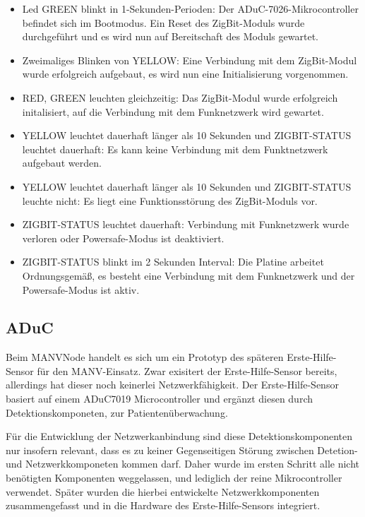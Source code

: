 \begin{itemize}
    \item{Led GREEN blinkt in 1-Sekunden-Perioden:} Der ADuC-7026-Mikrocontroller befindet sich im Bootmodus. Ein Reset des
                                                    ZigBit-Moduls wurde durchgeführt und es wird nun auf Bereitschaft des Moduls
                                                    gewartet.
    \item{Zweimaliges Blinken von YELLOW:} Eine Verbindung mit dem ZigBit-Modul wurde erfolgreich aufgebaut, es wird nun eine 
                                           Initialisierung vorgenommen.
    \item{RED, GREEN leuchten gleichzeitig:} Das ZigBit-Modul wurde erfolgreich initalisiert, auf die Verbindung mit dem 
                                                Funknetzwerk wird gewartet.
    \item{YELLOW leuchtet dauerhaft länger als 10 Sekunden und
          ZIGBIT-STATUS leuchtet dauerhaft:} Es kann keine Verbindung mit dem Funktnetzwerk aufgebaut werden.
    \item{YELLOW leuchtet dauerhaft länger als 10 Sekunden und ZIGBIT-STATUS leuchte nicht:} Es liegt eine Funktionsstörung des
          ZigBit-Moduls vor.
    \item{ZIGBIT-STATUS leuchtet dauerhaft:} Verbindung mit Funknetzwerk wurde verloren oder Powersafe-Modus ist deaktiviert.
    \item{ZIGBIT-STATUS blinkt im 2 Sekunden Interval:} Die Platine arbeitet Ordnungsgemäß, es besteht eine Verbindung mit dem
                                                        Funknetzwerk und der Powersafe-Modus ist aktiv.
\end{itemize}
                                                        

\subsection{ADuC}
Beim MANVNode handelt es sich um ein Prototyp des späteren Erste-Hilfe-Sensor für den MANV-Einsatz. Zwar exisitert der 
Erste-Hilfe-Sensor bereits, allerdings hat dieser noch keinerlei Netzwerkfähigkeit. Der Erste-Hilfe-Sensor basiert
auf einem ADuC7019 Microcontroller und ergänzt diesen durch Detektionskomponeten, zur Patientenüberwachung.

Für die Entwicklung der Netzwerkanbindung sind diese Detektionskomponenten nur insofern relevant, dass es zu keiner
Gegenseitigen Störung zwischen Detetion- und Netzwerkkomponeten kommen darf. Daher wurde im ersten Schritt alle nicht
benötigten Komponenten weggelassen, und lediglich der reine Mikrocontroller verwendet. Später wurden die hierbei
entwickelte Netzwerkkomponenten zusammengefasst und in die Hardware des Erste-Hilfe-Sensors integriert.

